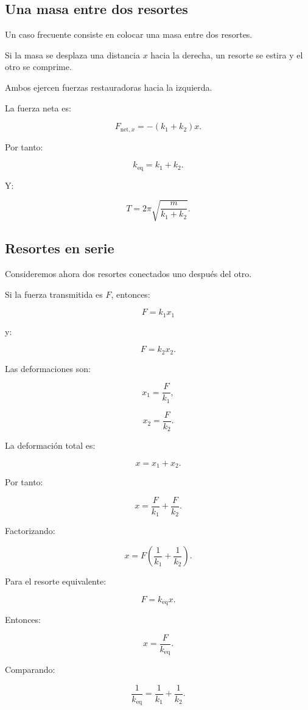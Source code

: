 \subsection{Una masa entre dos resortes}

Un caso frecuente consiste en colocar una masa entre dos resortes.

Si la masa se desplaza una distancia \(x\) hacia la derecha, un resorte se estira y el otro se comprime.

Ambos ejercen fuerzas restauradoras hacia la izquierda.

La fuerza neta es:

\[ F_{\text{net},x}=-(k_1+k_2)x. \]

Por tanto:

\[ \boxed{k_{\mathrm{eq}}=k_1+k_2}. \]

Y:

\[ \boxed{T=2\pi\sqrt{\frac{m}{k_1+k_2}}}. \]


\subsection{Resortes en serie}

Consideremos ahora dos resortes conectados uno después del otro.

Si la fuerza transmitida es \(F\), entonces:

\[ F=k_1x_1 \]

y:

\[ F=k_2x_2. \]

Las deformaciones son:

\[ x_1=\frac{F}{k_1}, \]

\[ x_2=\frac{F}{k_2}. \]

La deformación total es:

\[ x=x_1+x_2. \]

Por tanto:

\[
x
=
\frac{F}{k_1}
+
\frac{F}{k_2}.
\]

Factorizando:

\[
x
=
F
\left(
\frac{1}{k_1}
+
\frac{1}{k_2}
\right).
\]

Para el resorte equivalente:

\[ F=k_{\mathrm{eq}}x. \]

Entonces:

\[ x=\frac{F}{k_{\mathrm{eq}}}. \]

Comparando:

\[ \boxed{\frac{1}{k_{\mathrm{eq}}}=\frac{1}{k_1}+\frac{1}{k_2}}. \]

